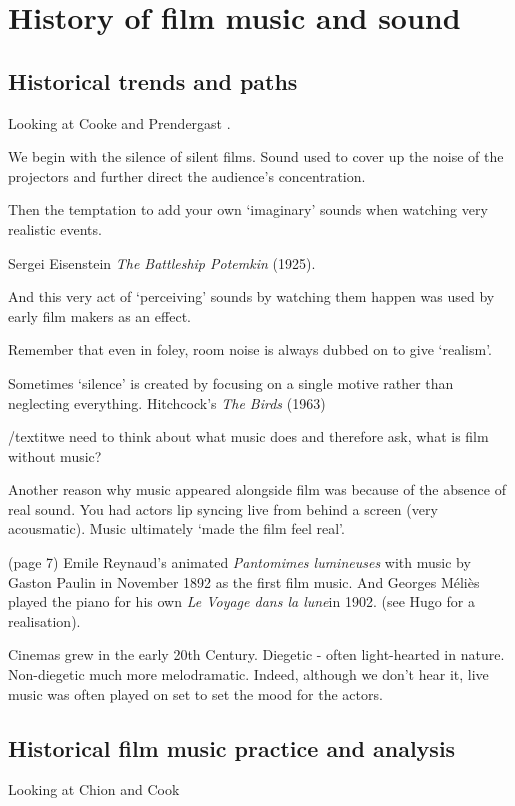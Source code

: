 
\chapter{History of film music and sound}
\label{history}

\section{Historical trends and paths}
Looking at Cooke \citeyearpar{cooke2008history} and Prendergast \citeyearpar{prendergast1992film}.

We  begin with the silence of silent films.  
Sound used to cover up the noise of the projectors and further direct the audience's concentration.

Then the temptation to add your own `imaginary' sounds when watching very realistic events. 

Sergei Eisenstein \textit{The Battleship Potemkin} (1925). 

And this very act of `perceiving' sounds by watching them happen was used by early film makers as an effect. 

Remember that even in foley, room noise is always dubbed on to give `realism'.

Sometimes `silence' is created by focusing on a single motive rather than neglecting everything. Hitchcock's \textit{The Birds} (1963) 

/textit{we need to think about what music does and therefore ask, what is film without music?}

Another reason why music appeared alongside film was because of the absence of real sound. You had actors lip syncing live from behind a screen (very acousmatic). Music ultimately `made the film feel real'. 

(page 7) Emile Reynaud's animated \textit{Pantomimes lumineuses} with music by Gaston Paulin in November 1892 as the first film music. And Georges M\'eli\`es played the piano for his own \textit{Le Voyage dans la lune}in 1902. (see Hugo for a realisation). 

Cinemas grew in the early 20th Century. 
Diegetic - often light-hearted in nature. Non-diegetic much more melodramatic. Indeed, although we don't hear it, live music was often played on set to set the mood for the actors.  



\section{Historical film music practice and analysis}

Looking at Chion \citeyearpar{chion1990} and Cook \citeyearpar{cook1998analysing}

